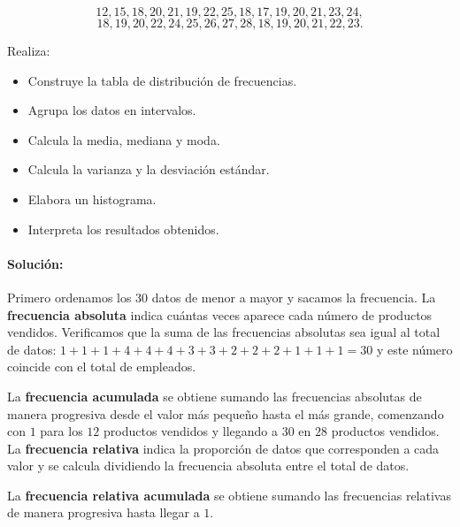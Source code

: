 \documentclass[12pt]{article}
\begin{document}
\[12, 15, 18, 20, 21, 19, 22, 25, 18, 17, 19, 20, 21, 23, 24, \]
\[18, 19, 20, 22, 24, 25, 26, 27, 28, 18, 19, 20, 21, 22, 23.\]

Realiza:
\begin{itemize}
    \item [1.] Construye la tabla de distribución de frecuencias.
    \item [2.] Agrupa los datos en intervalos.
    \item [3.] Calcula la media, mediana y moda.
    \item [4.] Calcula la varianza y la desviación estándar.
    \item [5.] Elabora un histograma.
    \item [6.] Interpreta los resultados obtenidos.
\end{itemize}

\paragraph{\textbf{Solución: }}

Primero ordenamos los 30 datos de menor a mayor y sacamos la frecuencia. La \textbf{frecuencia absoluta} indica cuántas veces aparece cada número de productos vendidos. Verificamos que la suma de las frecuencias absolutas sea igual al total de datos: $1 + 1 + 1 + 4 + 4 + 4 + 3 + 3 + 2 + 2 + 2 + 1 + 1 + 1 = 30$ y este número coincide con el total de empleados.

La \textbf{frecuencia acumulada} se obtiene sumando las frecuencias absolutas de manera progresiva desde el valor más pequeño hasta el más grande, comenzando con $1$ para los $12$ productos vendidos y llegando a $30$ en $28$ productos vendidos. La \textbf{frecuencia relativa} indica la proporción de datos que corresponden a cada valor y se calcula dividiendo la frecuencia absoluta entre el total de datos.

La \textbf{frecuencia relativa acumulada} se obtiene sumando las frecuencias relativas de manera progresiva hasta llegar a $1$.
\end{document}
